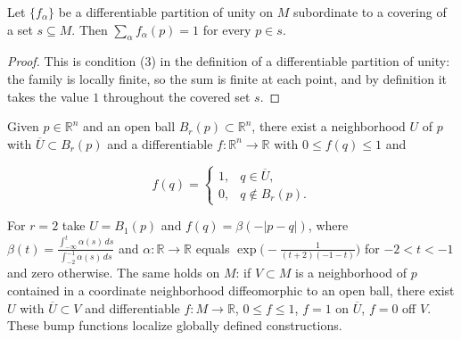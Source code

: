 \begin{lemma}
  \label{lem:dc-ch0-5-6-sum}
  \leanok
  Let $\{f_\alpha\}$ be a differentiable partition of unity on $M$ subordinate to a
  covering of a set $s\subseteq M$. Then $\sum_\alpha f_\alpha(p)=1$ for every
  $p\in s$.
\end{lemma}
\begin{proof}
  \sketch
  \leanok
  This is condition (3) in the definition of a differentiable partition of unity:
  the family is locally finite, so the sum is finite at each point, and by
  definition it takes the value $1$ throughout the covered set $s$.
\end{proof}

\begin{remark}
  \label{rem:dc-ch0-5-7}
  Given $p\in\mathbb{R}^n$ and an open ball $B_r(p)\subset\mathbb{R}^n$, there exist
  a neighborhood $U$ of $p$ with $\overline U\subset B_r(p)$ and a differentiable
  $f:\mathbb{R}^n\to\mathbb{R}$ with $0\le f(q)\le1$ and
  
  $$
  f(q)=\begin{cases}1,&q\in\overline U,\\ 0,&q\notin B_r(p).\end{cases}
  $$
  
  For $r=2$ take $U=B_1(p)$ and $f(q)=\beta(-|p-q|)$, where
  $\beta(t)=\frac{\int_{-\infty}^t\alpha(s)\,ds}{\int_{-2}^{-1}\alpha(s)\,ds}$ and
  $\alpha:\mathbb{R}\to\mathbb{R}$ equals $\exp\big(-\frac{1}{(t+2)(-1-t)}\big)$ for
  $-2<t<-1$ and zero otherwise. The same holds on $M$: if $V\subset M$ is a
  neighborhood of $p$ contained in a coordinate neighborhood diffeomorphic to an
  open ball, there exist $U$ with $\overline U\subset V$ and differentiable
  $f:M\to\mathbb{R}$, $0\le f\le1$, $f=1$ on $\overline U$, $f=0$ off $V$.
  These bump functions localize globally defined constructions.
\end{remark}
